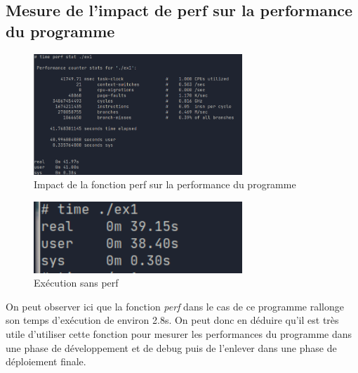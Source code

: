 \documentclass{ReportTemplate}
\begin{document}
\subsection{Mesure de l'impact de perf sur la performance du programme}
\begin{figure}[H]
    \centering
    \includegraphics[width=0.7\textwidth]{imageSources/time_with_perf.png}
    \caption{Impact de la fonction perf sur la performance du programme}
    \label{fig:perfImpact}
\end{figure}
\begin{figure}[H]
    \centering
    \includegraphics[width=0.7\textwidth]{imageSources/time_without_perf.png}
    \caption{Exécution sans perf}
    \label{fig:perfImpact2}
\end{figure}
On peut observer ici que la fonction \textit{perf} dans le cas de ce programme
rallonge son temps d'exécution de environ 2.8s. On peut donc en déduire qu'il
est très utile d'utiliser cette fonction pour mesurer les performances du
programme dans une phase de développement et de debug puis de l'enlever dans une
phase de déploiement finale. \newpage
\end{document}
